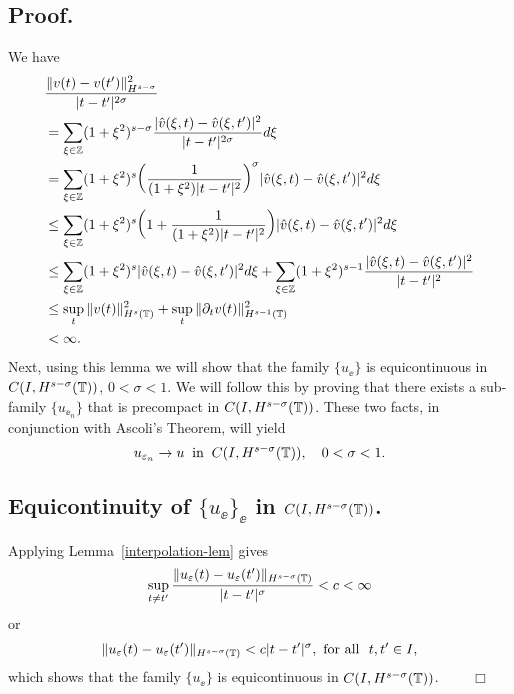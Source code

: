 \subsection{Proof.}  We have
\begin{equation*}
\begin{split}
& \frac{\|v(t) - v(t')\|^2_{H^{s - \sigma}}}{|t - t'|^{2\sigma}}
\\
& = 
\sum_{\xi \in \mathbb{Z}} (1 + \xi^2)^{s- \sigma} 
\frac{|\hat{v}(\xi, t) - \hat{v}(\xi, t')|^2}{|t-t'|^{2\sigma}} d\xi\\
& = \sum_{\xi \in \mathbb{Z}} (1+\xi^2)^s 
\bigg(\frac{1}{(1+ \xi^2)|t - t'|^2} \bigg)^\sigma |\hat{v}(\xi, t)- \hat{v}(\xi, t')|^2 d\xi\\
& \leq \sum_{\xi \in \mathbb{Z}}(1+\xi^2)^s \bigg( 1 + \frac{1}{(1+\xi^2)|t-t'|^2} \bigg)
|\hat{v}(\xi,t) - \hat{v}(\xi,t')|^2 d\xi \\
& \leq \sum_{\xi \in \mathbb{Z}} (1+ \xi^2)^s |\hat{v}(\xi, t)- \hat{v}(\xi, t')|^2 d\xi
+ \sum_{\xi \in \mathbb{Z}} (1+ \xi^2)^{s-1} \frac{|\hat{v}(\xi, t) - \hat{v} (\xi, t')|^2}{|t-t'|^2} \\
& \leq  \sup_t \|v(t)\|_{H^s(\mathbb{T})}^2 + \sup_t
\| \partial_t v(t) \|_{H^{s-1}(\mathbb{T})}^2
\\
& < \infty.
\\
\end{split}
\end{equation*}
%
%
Next, using this lemma we will show that the family $\{u_\ee\}$ is
equicontinuous in $C(I, H^{s-\sigma}(\mathbb{T}))$, $0 < \sigma < 1$. We
will follow this by proving that there exists a sub-family
$\{u_{\ee_n} \}$ that is precompact in $C(I,
H^{s-\sigma}(\mathbb{T}))$. These two facts, in conjunction with Ascoli's
Theorem, will yield
\begin{equation}
\label{strong-conv2}
u_{\varepsilon_n} \to u \; \; \text{in} \; \; C(I,H^{s-\sigma}(\mathbb{T})),
\quad
0 < \sigma < 1.
\end{equation}
%
%
%
%
%
\subsection{Equicontinuity of $\{u_\ee\}_\ee$  in
$C(I,H^{s-\sigma}(\mathbb{T}))$.} Applying  Lemma~\ref{interpolation-lem} gives 
%
\begin{equation}
\label{equic-1}
\sup_{t \neq t'} \frac {\|u_\varepsilon(t) - u_\varepsilon(t') \|_{H^{s -
\sigma}(\mathbb{T})}}{|t - t'|^\sigma} < c<\infty
\end{equation}
%
or
%
\begin{equation}
\label{equic-2}
\|u_\varepsilon(t) - u_\varepsilon(t') \|_{H^{s - \sigma}(\mathbb{T})}< c|t - t'|^\sigma, 
 \ \text{for all} \  \,\,  t, t'\in I,
\end{equation}
%
which shows that  the family  $\{u_\ee\}$ is equicontinuous in 
$C(I, H^{s-\sigma}(\mathbb{T}))$. $\qquad \Box$
%
%
%
%
%
%
%
%
%
%
%		
